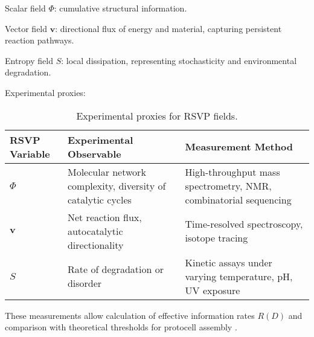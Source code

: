 \documentclass[openany]{book}
\begin{document}
Scalar field $\Phi$: cumulative structural information.

Vector field $\mathbf{v}$: directional flux of energy and material, capturing persistent reaction pathways.

Entropy field $S$: local dissipation, representing stochasticity and environmental degradation.

Experimental proxies:

\begin{table}[h]
\centering
\begin{tabular}{lll}
\toprule
RSVP Variable & Experimental Observable & Measurement Method \\
\midrule
$\Phi$ & Molecular network complexity, diversity of catalytic cycles & High-throughput mass spectrometry, NMR, combinatorial sequencing \\
$\mathbf{v}$ & Net reaction flux, autocatalytic directionality & Time-resolved spectroscopy, isotope tracing \\
$S$ & Rate of degradation or disorder & Kinetic assays under varying temperature, pH, UV exposure \\
\bottomrule
\end{tabular}
\caption{Experimental proxies for RSVP fields.}
\end{table}

These measurements allow calculation of effective information rates $R(D)$ and comparison with theoretical thresholds for protocell assembly \citep{peng2022}.
\end{document}
